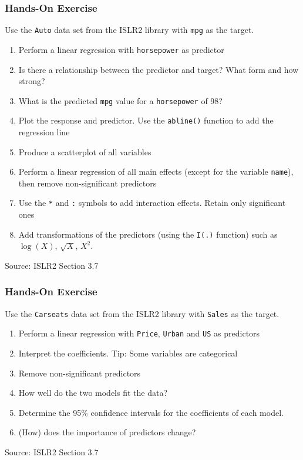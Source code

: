 \begin{tcolorbox}[colback=code]
\subsubsection*{Hands-On Exercise} 
\noindent Use the \texttt{Auto} data set from the ISLR2 library with \texttt{mpg} as the target.
  \begin{enumerate}
     \item Perform a linear regression with \texttt{horsepower} as predictor
     \item Is there a relationship between the predictor and target? What form and how strong?
     \item What is the predicted \texttt{mpg} value for a \texttt{horsepower} of 98? 
     \item Plot the response and predictor. Use the \texttt{abline()} function to add the regression line
     \item Produce a scatterplot of all variables
     \item Perform a linear regression of all main effects (except for the variable \texttt{name}), then remove non-significant predictors
     \item Use the \texttt{*} and \texttt{:} symbols to add interaction effects. Retain only significant ones
     \item Add transformations of the predictors (using the \texttt{I(.)} function) such as $\log(X)$, $\sqrt{X}$, $X^2$.
  \end{enumerate}

{\footnotesize \vspace{\baselineskip} Source: ISLR2 Section 3.7}
\end{tcolorbox}

\begin{tcolorbox}[colback=code]
\subsubsection*{Hands-On Exercise} 
\noindent Use the \texttt{Carseats} data set from the ISLR2 library with \texttt{Sales} as the target.
  \begin{enumerate}
     \item Perform a linear regression with \texttt{Price}, \texttt{Urban} and \texttt{US} as predictors
     \item Interpret the coefficients. Tip: Some variables are categorical
     \item Remove non-significant predictors
     \item How well do the two models fit the data?
     \item Determine the 95\% confidence intervals for the coefficients of each model.
     \item (How) does the importance of predictors change?
  \end{enumerate}

{\footnotesize \vspace{\baselineskip} Source: ISLR2 Section 3.7}
\end{tcolorbox}

